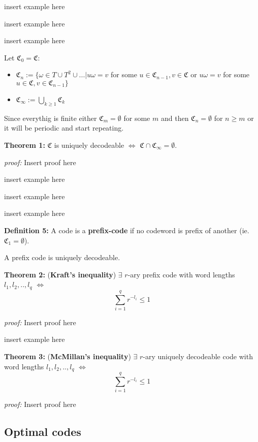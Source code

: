 \documentclass{article}
\begin{document}
insert example here

insert example here

insert example here
 
 
\noindent Let $\mathfrak{C}_0 = \mathfrak{C}$:

\begin{itemize}
	\item $\mathfrak{C}_n := \{   \omega \in T \cup T^2 \cup... | u\omega = v$ for some $u \in \mathfrak{C}_{n-1}, v \in \mathfrak{C}$ or $ u\omega = v$ for some $u \in \mathfrak{C}, v \in \mathfrak{C}_{n-1}   \}$
	\item $\mathfrak{C}_{\infty} := \bigcup_{k \geq 1} \mathfrak{C}_k$
\end{itemize}

Since everythig is finite either $\mathfrak{C}_m = \emptyset$ for some $m$ and then $\mathfrak{C}_n = \emptyset$ for $n\geq m$ or it will be periodic and start repeating.


\noindent\textbf{Theorem 	1:} $\mathfrak{C}$ is uniquely decodeable $\Longleftrightarrow$ $\mathfrak{C} \cap \mathfrak{C}_{\infty} = \emptyset$.

 \noindent\textit{proof:}  Insert proof here

insert example here

insert example here

insert example here

\noindent\textbf{Definition 	5:}  A code is a \textbf{prefix-code} if no codeword is prefix of another (ie. $\mathfrak{C}_1 = \emptyset$).

\noindent A prefix code is uniquely decodeable.

\noindent\textbf{Theorem 	2:} (\textbf{Kraft's inequality}) $\exists$ $r$-ary prefix code with word lengths $l_1, l_2, .., l_q$ $\Longleftrightarrow$ 
$$
\sum_{i = 1}^{q} r^{-l_i} \leq 1
$$ 

 \noindent\textit{proof:}  Insert proof here

insert example here

\noindent\textbf{Theorem 	3:} (\textbf{McMillan's inequality})  $\exists$ $r$-ary uniquely decodeable code with word lengths $l_1, l_2, .., l_q$ $\Longleftrightarrow$ 
$$
\sum_{i = 1}^{q} r^{-l_i} \leq 1
$$

 \noindent\textit{proof:}  Insert proof here
 
 
		\subsection{Optimal codes}
		
\end{document}
